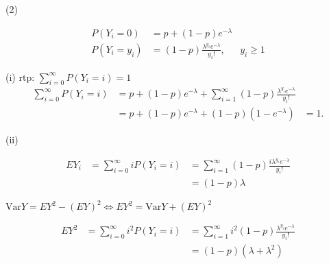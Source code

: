 \documentclass{amsart}
\def\Var{\text{Var}}
\begin{document}
(2)

\begin{equation*}
\begin{array}{lll}
P(Y_i = 0) &= p + (1 - p) e^{-\lambda} & \\
P(Y_i = y_i) &= (1 - p) \frac{\lambda^{y_i} e^{-\lambda}}{y_i !}, & y_i \geq 1
\end{array}
\end{equation*}

(i) rtp: $\sum_{i=0}^{\infty} P(Y_i = i) = 1$
\begin{equation*}
\begin{array}{lll}
\sum_{i=0}^{\infty} P(Y_i = i) &= p + (1 - p) e^{-\lambda} + \sum_{i=1}^{\infty} (1 - p) \frac{\lambda^{y_i} e^{-\lambda}}{y_i !} \\
&= p + (1 - p) e^{-\lambda} + (1 - p) (1 - e^{-\lambda}) &= 1.
\end{array}
\end{equation*}

(ii)

\begin{equation*}
\begin{array}{lll}
E Y_i &= \sum_{i=0}^{\infty} i P(Y_i = i) &= \sum_{i=1}^{\infty} (1 - p) \frac{i \lambda^{y_i} e^{-\lambda}}{y_i !} \\
&&= (1 - p) \lambda
\end{array}
\end{equation*}

$\Var Y = E Y^2 - (E Y)^2 \Leftrightarrow E Y^2 = \Var Y + (E Y)^2$

\begin{equation*}
\begin{array}{lll}
E Y^2 &= \sum_{i=0}^\infty i^2 P(Y_i = i) &= \sum_{i=1}^\infty i^2 (1 - p) \frac{\lambda^{y_i} e^{-\lambda}}{y_i !} \\
&&= (1 - p) (\lambda + \lambda^2)
\end{array}
\end{equation*}
\end{document}
